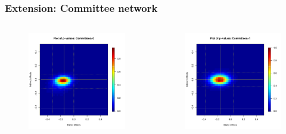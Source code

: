 \documentclass{beamer}
\begin{document}
\begin{frame}
\frametitle{Extension: Committee network}
\begin{columns}[c]

\begin{figure}
\centering
\includegraphics[scale=0.35]{pval_plot_coppock_committee_1ormore.pdf}
\end{figure}

\begin{figure}
\centering
\includegraphics[scale=0.35]{pval_plot_coppock_committee_2ormore.pdf}
\end{figure}

\end{columns}
\end{frame}
\end{document}
